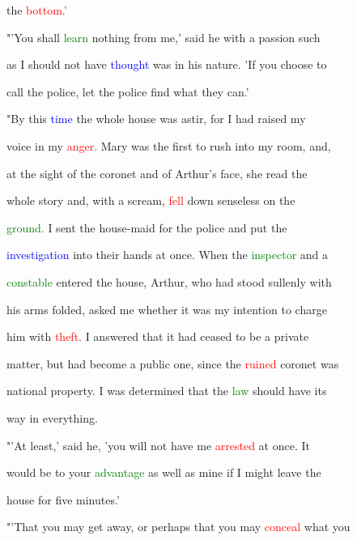  the \textcolor{red}{bottom.'}



 "'You shall \textcolor{green}{learn} nothing from me,' said he with a \textcolor{BurntOrange}{passion} such

 as I should not have \textcolor{blue}{thought} was in his nature. 'If you choose to

 call the \textcolor{BurntOrange}{police,} let the \textcolor{BurntOrange}{police} find what they can.'



 "By this \textcolor{blue}{time} the whole house was astir, for I had raised my

 voice in my \textcolor{red}{anger.} Mary was the first to rush into my room, and,

 at the sight of the coronet and of Arthur's face, she read the

 whole story and, with a \textcolor{BurntOrange}{scream,} \textcolor{red}{fell} down \textcolor{BurntOrange}{senseless} on the

 \textcolor{green}{ground.} I sent the house-maid for the \textcolor{BurntOrange}{police} and put the

 \textcolor{blue}{investigation} into their hands at once. When the \textcolor{green}{inspector} and a

 \textcolor{green}{constable} entered the house, Arthur, who had stood sullenly with

 his arms folded, asked me whether it was my intention to charge

 him with \textcolor{red}{theft.} I answered that it had ceased to be a private

 matter, but had become a \textcolor{BurntOrange}{public} one, since the \textcolor{red}{ruined} coronet was

 national property. I was determined that the \textcolor{green}{law} should have its

 way in everything.



 "'At least,' said he, 'you will not have me \textcolor{red}{arrested} at once. It

 would be to your \textcolor{green}{advantage} as well as mine if I might \textcolor{BurntOrange}{leave} the

 house for five minutes.'



 "'That you may get away, or perhaps that you may \textcolor{red}{conceal} what you

